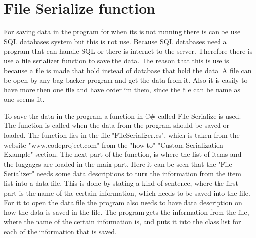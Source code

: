\section{File Serialize function}
For saving data in the program for when its is not running there is can be use SQL databases system but this is not use. Because SQL databases need a program that can handle SQL or there is internet to the server. Therefore there is use a file serializer function to save the data. The reason that this is use is because a file is made that hold instead of database that hold the data. A file can be open by any bag backer program and get the data from it. Also it is easily to have more then one file and have order im them, since the file can be name as one seems fit.

To save the data in the program a function in C\# called File Serialize is used. The function is called when the data from the program should be saved or loaded. The function lies in the file "FileSerializer.cs", which is taken from the website "www.codeproject.com" from the "how to" "Custom Serialization Example" section. The next part of the function, is where the list of items and the luggages are loaded in the main part. 
Here it can be seen that the "File Serializer" needs some data descriptions to turn the information from the item list into a data file. 
This is done by stating a kind of sentence, where the first part is the name of the certain information, which needs to be saved into the file. 
For it to open the data file the program also needs to have data description on how the data is saved in the file. The program gets the information from the file, where the name of the certain information is, and puts it into the class list for each of the information that is saved.